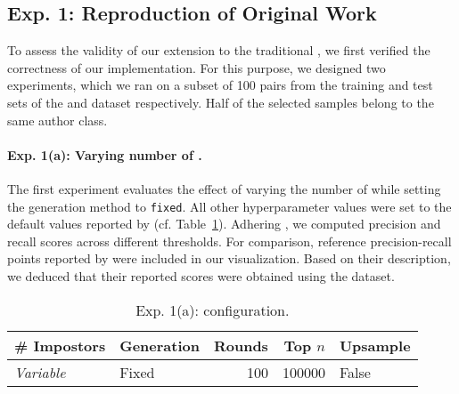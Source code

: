 \subsection{Exp. 1: Reproduction of Original Work}

To assess the validity of our extension to the traditional \impAppr{}, we first verified the correctness of our implementation. 
For this purpose, we designed two experiments, which we ran on a subset of 100 pairs from the training and test sets of the \dataBlog{} and \dataStudent{} dataset respectively. 
Half of the selected samples belong to the same author class.

\paragraph{Exp. 1(a): Varying number of \imps{}.}
The first experiment evaluates the effect of varying the number of \imps{} while setting the \imp{} generation method to \texttt{fixed}.
All other hyperparameter values were set to the default values reported by \citet{koppel_determining_2014} (cf. Table~\ref{tab:repr_exp1}). 
Adhering \citet{koppel_determining_2014}, we computed precision and recall scores across different thresholds.
For comparison, reference precision-recall points reported by \citet{koppel_determining_2014} were included in our visualization. 
Based on their description, we deduced that their reported scores were obtained using the \dataBlog{} dataset.


\begin{table}[h]
\centering\small
\caption{Exp. 1(a): \impAppr{} configuration.}
\label{tab:repr_exp1}
\begin{tabular}{@{}llrrl@{}}   %
\toprule
\# Impostors & Generation & Rounds & Top $n$ & Upsample \\
\midrule
\textit{Variable} & Fixed & 100 & \num{100000} & False \\
\bottomrule
\end{tabular}%
\end{table}



